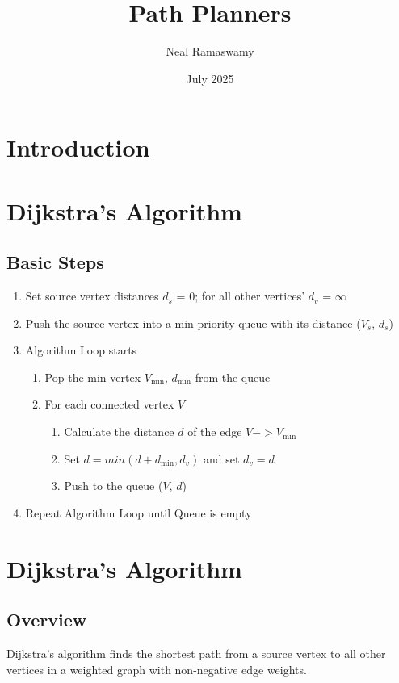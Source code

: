 \documentclass{article}
\title{Path Planners}
\author{Neal Ramaswamy}
\date{July 2025}
\begin{document}
\maketitle
\section{Introduction}
\section{Dijkstra's Algorithm}
\subsection{Basic Steps}
\begin{enumerate}
    \item Set source vertex distances $d_s$ = 0; for all other vertices' $d_v$ = $\infty$
    \item Push the source vertex into a min-priority queue with its distance ($V_s$, $d_s$)
    \item Algorithm Loop starts
        \begin{enumerate}
            \item Pop the min vertex $V_{\text{min}}$, $d_{\text{min}}$ from the queue
            \item For each connected vertex $V$
                \begin{enumerate}
                    \item Calculate the distance $d$ of the edge $V -> V_{\text{min}}$
                    \item Set $d = min(d + d_{\text{min}}, d_v)$ and set $d_v = d$
                    \item Push to the queue ($V$, $d$)
                    
                \end{enumerate}
        \end{enumerate}
    \item Repeat Algorithm Loop until Queue is empty
\end{enumerate}

\section{Dijkstra's Algorithm}

\subsection{Overview}
Dijkstra's algorithm finds the shortest path from a source vertex to all other vertices in a weighted graph with non-negative edge weights.
\end{document}
